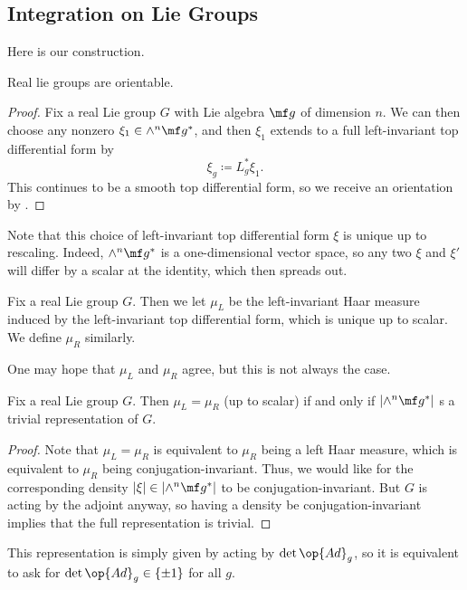 \documentclass[../notes.tex]{subfiles}
\begin{document}
\subsection{Integration on Lie Groups}
Here is our construction.
\begin{lemma}
	Real lie groups are orientable.
\end{lemma}
\begin{proof}
	Fix a real Lie group $G$ with Lie algebra $\mf g$ of dimension $n$. We can then choose any nonzero $\xi_1\in\land^n\mf g^*$, and then $\xi_1$ extends to a full left-invariant top differential form by
	\[\xi_g\coloneqq L_g^*\xi_1.\]
	This continues to be a smooth top differential form, so we receive an orientation by .
\end{proof}
\begin{remark}
	Note that this choice of left-invariant top differential form $\xi$ is unique up to rescaling. Indeed, $\land^n\mf g^*$ is a one-dimensional vector space, so any two $\xi$ and $\xi'$ will differ by a scalar at the identity, which then spreads out.
\end{remark}
\begin{definition}
	Fix a real Lie group $G$. Then we let $\mu_L$ be the left-invariant Haar measure induced by the left-invariant top differential form, which is unique up to scalar. We define $\mu_R$ similarly.
\end{definition}
One may hope that $\mu_L$ and $\mu_R$ agree, but this is not always the case.
\begin{proposition}
	Fix a real Lie group $G$. Then $\mu_L=\mu_R$ (up to scalar) if and only if $\left|\land^n\mf g^*\right|$ s a trivial representation of $G$.
\end{proposition}
\begin{proof}
	Note that $\mu_L=\mu_R$ is equivalent to $\mu_R$ being a left Haar measure, which is equivalent to $\mu_R$ being conjugation-invariant. Thus, we would like for the corresponding density $\left|\xi\right|\in\left|\land^n\mf g^*\right|$ to be conjugation-invariant. But $G$ is acting by the adjoint anyway, so having a density be conjugation-invariant implies that the full representation is trivial.
\end{proof}
\begin{remark}
	This representation is simply given by acting by $\det\op{Ad}_g$, so it is equivalent to ask for $\det{\op{Ad}_g}\in\{\pm1\}$ for all $g$.
\end{remark}
\end{document}
